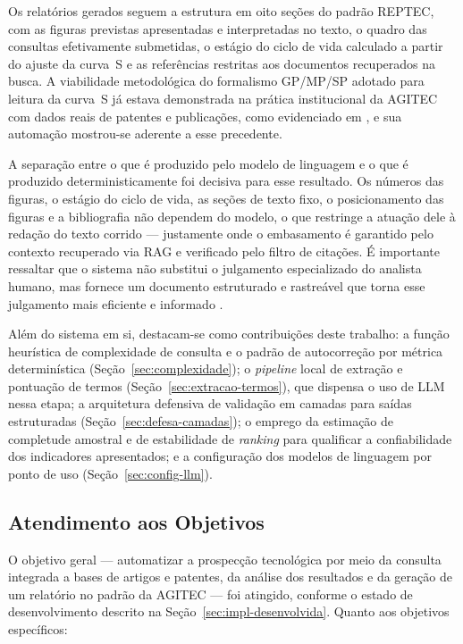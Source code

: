 \documentclass[12pt, a4paper]{article}
\begin{document}
  Os relatórios gerados seguem a estrutura em oito seções do padrão REPTEC,
com as figuras previstas apresentadas e interpretadas no texto, o quadro das
consultas efetivamente submetidas, o estágio do ciclo de vida calculado a
partir do ajuste da curva~S e as referências restritas aos documentos
recuperados na busca. A viabilidade metodológica do formalismo GP/MP/SP
adotado para leitura da curva~S já estava demonstrada na prática institucional
da AGITEC com dados reais de patentes e publicações, como evidenciado em
\cite{reptec2023tetra}, e sua automação mostrou-se aderente a esse
precedente.

  A separação entre o que é produzido pelo modelo de linguagem e o que é
produzido deterministicamente foi decisiva para esse resultado. Os números das
figuras, o estágio do ciclo de vida, as seções de texto fixo, o posicionamento
das figuras e a bibliografia não dependem do modelo, o que restringe a atuação
dele à redação do texto corrido --- justamente onde o embasamento é garantido
pelo contexto recuperado via RAG e verificado pelo filtro de citações. É
importante ressaltar que o sistema não substitui o julgamento especializado do
analista humano, mas fornece um documento estruturado e rastreável que torna
esse julgamento mais eficiente e informado \cite{lewis2020, ji2022}.

  Além do sistema em si, destacam-se como contribuições deste trabalho: a
função heurística de complexidade de consulta e o padrão de autocorreção por
métrica determinística (Seção~\ref{sec:complexidade}); o \textit{pipeline} local de extração e
pontuação de termos (Seção~\ref{sec:extracao-termos}), que dispensa o uso de
LLM nessa etapa; a arquitetura defensiva de validação em camadas para saídas estruturadas (Seção~\ref{sec:defesa-camadas}); o emprego da estimação de completude amostral e de
estabilidade de \textit{ranking} para qualificar
a confiabilidade dos indicadores apresentados; e a configuração dos modelos de
linguagem por ponto de uso (Seção~\ref{sec:config-llm}).

  \subsection{Atendimento aos Objetivos}

  O objetivo geral --- automatizar a prospecção tecnológica por meio da
consulta integrada a bases de artigos e patentes, da análise dos resultados e
da geração de um relatório no padrão da AGITEC --- foi atingido, conforme o
estado de desenvolvimento descrito na Seção~\ref{sec:impl-desenvolvida}. Quanto aos
objetivos específicos:
\end{document}
